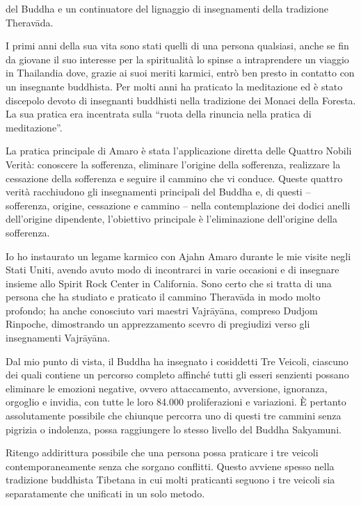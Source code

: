 
 del Buddha e un continuatore del lignaggio di insegnamenti della tradizione Theravāda.

I primi anni della sua vita sono stati quelli di una persona qualsiasi, anche se fin da giovane il suo interesse per la spiritualità lo spinse a intraprendere un viaggio in Thailandia dove, grazie ai suoi meriti karmici, entrò ben presto in contatto con un insegnante buddhista. Per molti anni ha praticato la meditazione ed è stato discepolo devoto di insegnanti buddhisti nella tradizione dei Monaci della Foresta. La sua pratica era incentrata sulla ``ruota della rinuncia nella pratica di meditazione''.

La pratica principale di Amaro è stata l'applicazione diretta delle Quattro Nobili Verità: conoscere la sofferenza, eliminare l'origine della sofferenza, realizzare la cessazione della sofferenza e seguire il cammino che vi conduce. Queste quattro verità racchiudono gli insegnamenti principali del Buddha e, di questi -- sofferenza, origine, cessazione e cammino -- nella contemplazione dei dodici anelli dell'origine dipendente, l'obiettivo principale è l'eliminazione dell'origine della sofferenza.

Io ho instaurato un legame karmico con Ajahn Amaro durante le mie visite negli Stati Uniti, avendo avuto modo di incontrarci in varie occasioni e di insegnare insieme allo Spirit Rock Center in California. Sono certo che si tratta di una persona che ha studiato e praticato il cammino Theravāda in modo molto profondo; ha anche conosciuto vari maestri Vajrāyāna, compreso Dudjom Rinpoche, dimostrando un apprezzamento scevro di pregiudizi verso gli insegnamenti Vajrāyāna.

Dal mio punto di vista, il Buddha ha insegnato i cosiddetti Tre Veicoli, ciascuno dei quali contiene un percorso completo affinché tutti gli esseri senzienti possano eliminare le emozioni negative, ovvero attaccamento, avversione, ignoranza, orgoglio e invidia, con tutte le loro 84.000 proliferazioni e variazioni. È pertanto assolutamente possibile che chiunque percorra uno di questi tre cammini senza pigrizia o indolenza, possa raggiungere lo stesso livello del Buddha Sakyamuni.

Ritengo addirittura possibile che una persona possa praticare i tre veicoli contemporaneamente senza che sorgano conflitti. Questo avviene spesso nella tradizione buddhista Tibetana in cui molti praticanti seguono i tre veicoli sia separatamente che unificati in un solo metodo.

